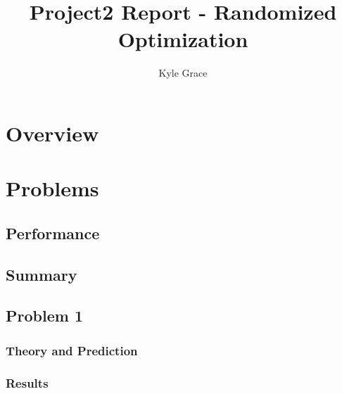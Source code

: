 \documentclass[
	letterpaper, %
]{mlreport}
\author{Kyle Grace}
\title{Project2 Report - Randomized Optimization}
\begin{document}

\maketitle

\begin{abstract}
\end{abstract}

\section{Overview}

\section{Problems}

\subsection{Performance}
\subsection{Summary}

\subsection{Problem 1}
\subsubsection{Theory and Prediction}
\subsubsection{Results}
\end{document}
